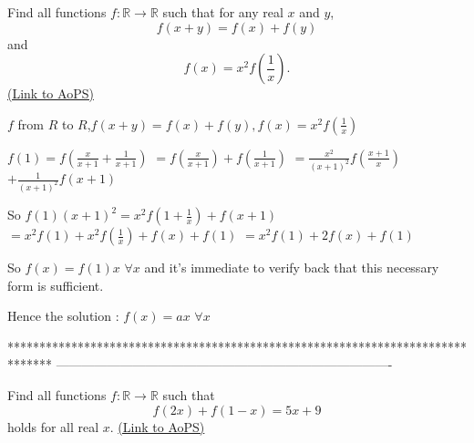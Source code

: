 \begin{problem}
	Find all functions $f: \mathbb R \to \mathbb R$ such that for any real $x$ and $y$, 
\[ f(x+y)=f(x)+f(y)\]
and
\[f(x)=x^2f\left( \frac 1x \right).\]
	\flushright \href{https://artofproblemsolving.com/community/c6h316568}{(Link to AoPS)}
\end{problem}



\begin{solution}
	\begin{tcolorbox}$ f$ from $ R$ to $ R$,$ f(x + y) = f(x) + f(y),f(x) = x^2f(\frac 1x)$\end{tcolorbox}

$ f(1)=f(\frac{x}{x+1}+\frac 1{x+1})$ $ =f(\frac{x}{x+1})+f(\frac 1{x+1})$ $ =\frac{x^2}{(x+1)^2}f(\frac{x+1}{x})$ $ +\frac 1{(x+1)^2}f(x+1)$ 

So $ f(1)(x+1)^2=x^2f(1+\frac 1x)+f(x+1)$ $ =x^2f(1)+x^2f(\frac 1x)+f(x)+f(1)$ $ =x^2f(1)+2f(x)+f(1)$

So $ f(x)=f(1)x$ $ \forall x$ and it's immediate to verify back that this necessary form is sufficient.

Hence the solution : $ \boxed{f(x)=ax}$ $ \forall x$
\end{solution}
*******************************************************************************
-------------------------------------------------------------------------------

\begin{problem}
	Find all functions $f: \mathbb R \to \mathbb R$ such that
\[ f(2x)+f(1-x)=5x+9\]
holds for all real $x$.
	\flushright \href{https://artofproblemsolving.com/community/c6h317255}{(Link to AoPS)}
\end{problem}



